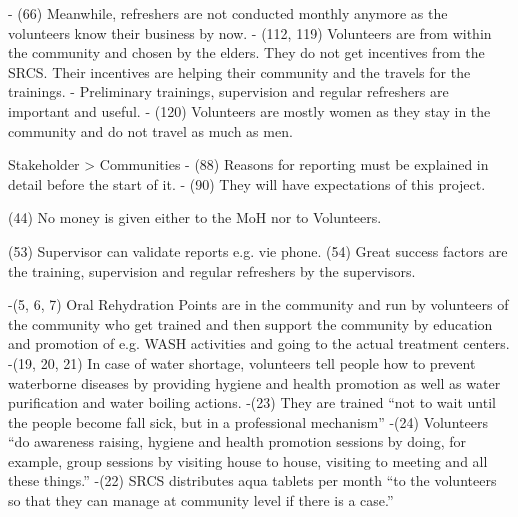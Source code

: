 
-	(66) Meanwhile, refreshers are not conducted monthly anymore as the volunteers know their business by now. 
-	(112, 119) Volunteers are from within the community and chosen by the elders. They do not get incentives from the SRCS. Their incentives are helping their community and the travels for the trainings.
-	Preliminary trainings, supervision and regular refreshers are important and useful.
-	(120) Volunteers are mostly women as they stay in the community and do not travel as much as men.

Stakeholder > Communities
-	(88) Reasons for reporting must be explained in detail before the start of it.
-	(90) They will have expectations of this project.

(44) No money is given either to the MoH nor to Volunteers.

(53) Supervisor can validate reports e.g. vie phone.
(54) Great success factors are the training, supervision and regular refreshers by the supervisors.


-(5, 6, 7) Oral Rehydration Points are in the community and run by volunteers of the community who get trained and then support the community by education and promotion of e.g. WASH activities and going to the actual treatment centers.
-(19, 20, 21) In case of water shortage, volunteers tell people how to prevent waterborne diseases by providing hygiene and health promotion as well as water purification and water boiling actions.
-(23) They are trained “not to wait until the people become fall sick, but in a professional mechanism”
-(24) Volunteers “do awareness raising, hygiene and health promotion sessions by doing, for example, group sessions by visiting house to house, visiting to meeting and all these things.”
-(22) SRCS distributes aqua tablets per month “to the volunteers so that they can manage at community level if there is a case.”

